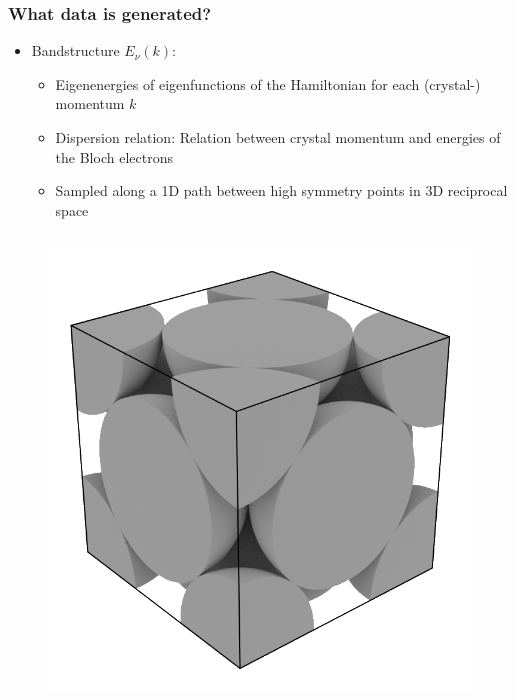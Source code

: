 \begin{frame}\frametitle{What data is generated?}
    \begin{itemize}
        

    \item Bandstructure $E_{\nu}(k)$:
        \begin{itemize}
        \item Eigenenergies of eigenfunctions of the Hamiltonian for each (crystal-) momentum $k$
        \item Dispersion relation: Relation between crystal momentum and energies of the Bloch electrons
        \item Sampled along a 1D path between high symmetry points in 3D reciprocal space 
        \end{itemize}
    \end{itemize}

    \begin{column}{.5\textwidth}
        \begin{figure}
            \includegraphics[width=0.7\linewidth]{fig/fcc_real.png}
        \end{figure}


\end{column}
\end{frame}
